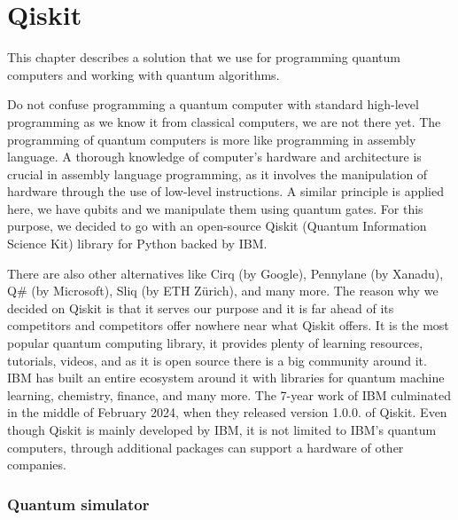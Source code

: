 \chapter{Qiskit}\label{ch:qiskit}
This chapter describes a solution that we use for programming quantum computers and working with quantum algorithms. 

Do not confuse programming a quantum computer with standard high-level programming as we know it from classical computers, we are not there yet. The programming of quantum computers is more like programming in assembly language. A thorough knowledge of computer's hardware and architecture is crucial in assembly language programming, as it involves the manipulation of hardware through the use of low-level instructions. A similar principle is applied here, we have qubits and we manipulate them using quantum gates. For this purpose, we decided to go with an open-source Qiskit (Quantum Information Science Kit) library for Python backed by IBM.

There are also other alternatives like Cirq (by Google), Pennylane (by Xanadu), Q\# (by Microsoft), Sliq (by ETH Zürich), and many more.  The reason why we decided on Qiskit is that it serves our purpose and it is far ahead of its competitors and competitors offer nowhere near what Qiskit offers. It is the most popular quantum computing library, it provides plenty of learning resources, tutorials, videos, and as it is open source there is a big community around it. IBM has built an entire ecosystem around it \cite{qiskit_ecosystem} with libraries for quantum machine learning, chemistry, finance, and many more. The 7-year work of IBM culminated in the middle of February 2024, when they released version 1.0.0. of Qiskit. Even though Qiskit is mainly developed by IBM, it is not limited to IBM's quantum computers, through additional packages can support a hardware of other companies.

\subsection{Quantum simulator}

